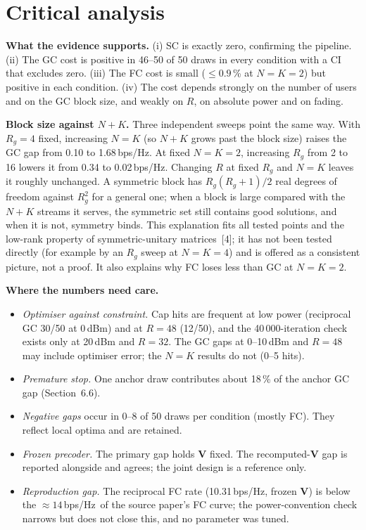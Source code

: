 \documentclass[10pt,a4paper]{article}
\newcommand{\bpsHz}{bps/Hz}
\begin{document}
\section{Critical analysis}
\textbf{What the evidence supports.} (i) SC is exactly zero, confirming the pipeline. (ii) The GC cost is positive in 46--50 of 50 draws in every condition with a CI that excludes zero. (iii) The FC cost is small ($\le0.9$\,\% at $N{=}K=2$) but positive in each condition. (iv) The cost depends strongly on the number of users and on the GC block size, and weakly on $R$, on absolute power and on fading.

\textbf{Block size against $N{+}K$.} Three independent sweeps point the same way. With $R_g=4$ fixed, increasing $N{=}K$ (so $N{+}K$ grows past the block size) raises the GC gap from 0.10 to 1.68\,\bpsHz. At fixed $N{=}K{=}2$, increasing $R_g$ from 2 to 16 lowers it from 0.34 to 0.02\,\bpsHz. Changing $R$ at fixed $R_g$ and $N{=}K$ leaves it roughly unchanged. A symmetric block has $R_g(R_g+1)/2$ real degrees of freedom against $R_g^2$ for a general one; when a block is large compared with the $N{+}K$ streams it serves, the symmetric set still contains good solutions, and when it is not, symmetry binds. This explanation fits all tested points and the low-rank property of symmetric-unitary matrices~[4]; it has not been tested directly (for example by an $R_g$ sweep at $N{=}K{=}4$) and is offered as a consistent picture, not a proof. It also explains why FC loses less than GC at $N{=}K{=}2$.

\textbf{Where the numbers need care.}
\begin{itemize}
\item \emph{Optimiser against constraint.} Cap hits are frequent at low power (reciprocal GC 30/50 at 0\,dBm) and at $R{=}48$ (12/50), and the 40\,000-iteration check exists only at 20\,dBm and $R{=}32$. The GC gaps at 0--10\,dBm and $R{=}48$ may include optimiser error; the $N{=}K$ results do not (0--5 hits).
\item \emph{Premature stop.} One anchor draw contributes about 18\,\% of the anchor GC gap (Section~6.6).
\item \emph{Negative gaps} occur in 0--8 of 50 draws per condition (mostly FC). They reflect local optima and are retained.
\item \emph{Frozen precoder.} The primary gap holds $\mathbf V$ fixed. The recomputed-$\mathbf V$ gap is reported alongside and agrees; the joint design is a reference only.
\item \emph{Reproduction gap.} The reciprocal FC rate (10.31\,\bpsHz, frozen $\mathbf V$) is below the $\approx14$\,\bpsHz\ of the source paper's FC curve; the power-convention check narrows but does not close this, and no parameter was tuned.
\end{itemize}
\end{document}
